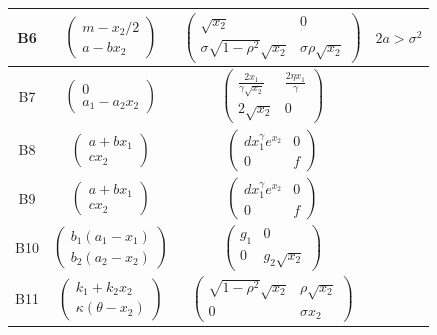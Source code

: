 \documentclass{article}
\begin{document}
\begin{table}[h!]
\begin{tabular}{|c|c|c|c|}
\hline
B6 & $\left( \begin{array}{c} m - x_2/2\\ a-bx_2 \end{array} \right)$ &
$\left( \begin{array}{cc} \sqrt{x_2} & 0\\ \sigma \sqrt{1-\rho^2}\sqrt{x_2} & \sigma \rho\sqrt{x_2} \end{array} \right)$ & $2a> \sigma^2$ \\
\hline
B7 & $\left( \begin{array}{c} 0\\ a_1-a_2x_2 \end{array} \right)$ &
$\left( \begin{array}{cc} \frac{2x_1}{\gamma\sqrt{x_2}} & \frac{2\eta x_1}{\gamma}\\ 2\sqrt{x_2} & 0 \end{array} \right)$ &  \\
\hline
B8 & $\left( \begin{array}{c} a+bx_1\\ cx_2 \end{array} \right)$ &
$\left( \begin{array}{cc} dx_1^{\gamma}e^{x_2} & 0\\ 0 & f \end{array} \right)$ &  \\
B9 & $\left( \begin{array}{c} a+bx_1\\ cx_2 \end{array} \right)$ &
$\left( \begin{array}{cc} dx_1^{\gamma}e^{x_2} & 0\\ 0 & f \end{array} \right)$ &  \\
\hline
B10 & 
$\left( \begin{array}{c} b_1(a_1-x_1)\\ b_2(a_2-x_2) \end{array} \right)$ & 
$\left( \begin{array}{cc} g_1 & 0\\ 0 & g_2\sqrt{x_2} \end{array} \right)$ & 
\\

\hline
B11 & 
$\left( \begin{array}{c} k_1 + k_2x_2\\ \kappa(\theta-x_2) \end{array} \right)$ & 
$\left( \begin{array}{cc} \sqrt{1-\rho^2}\sqrt{x_2} & \rho\sqrt{x_2}\\ 0 & \sigma x_2 \end{array} \right)$ & 
\\


\end{tabular}
\end{table}
\end{document}
